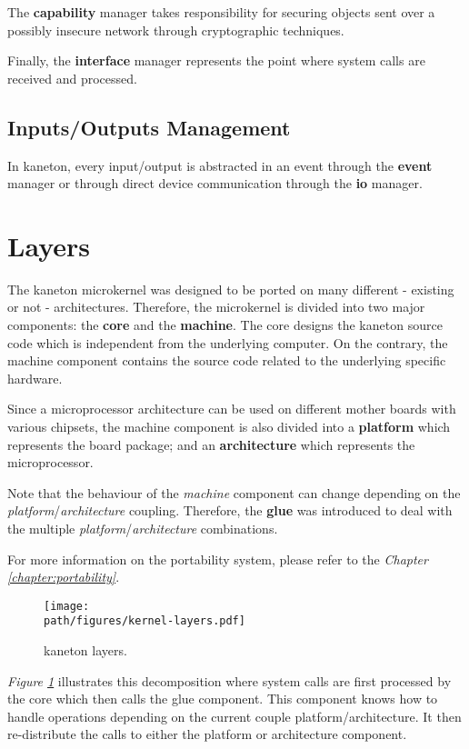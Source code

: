 The \textbf{capability} manager takes responsibility for securing objects
sent over a possibly insecure network through cryptographic techniques.

Finally, the \textbf{interface} manager represents the point where system
calls are received and processed.


\subsection*{Inputs/Outputs Management}

In kaneton, every input/output is abstracted in an event through the
\textbf{event} manager or through direct device communication through the
\textbf{io} manager.

%
%

\section{Layers}

The kaneton microkernel was designed to be ported on many different - existing
or not - architectures. Therefore, the microkernel is divided into two
major components: the \textbf{core} and the \textbf{machine}. The core
designs the kaneton source code which is independent from the underlying
computer. On the contrary, the machine component contains the source code
related to the underlying specific hardware.

Since a microprocessor architecture can be used on different mother boards
with various chipsets, the machine component is also divided into a
\textbf{platform} which represents the board package; and an
\textbf{architecture} which represents the microprocessor.

Note that the behaviour of the \textit{machine} component can change depending
on the \textit{platform}/\textit{architecture} coupling. Therefore, the
\textbf{glue} was introduced to deal with the multiple
\textit{platform}/\textit{architecture} combinations.

For more information on the portability system, please refer to the
\textit{Chapter \ref{chapter:portability}}.

\begin{figure}[h]
  \begin{center}
    \texttt{[image: \\path/figures/kernel-layers.pdf]}
    \caption{kaneton layers.}
    \label{figure:kernel-layers}
  \end{center}
\end{figure}

\textit{Figure \ref{figure:kernel-layers}} illustrates this decomposition where
system calls are first processed by the core which then calls the glue
component. This component knows how to handle operations depending on the
current couple platform/architecture. It then re-distribute the calls to
either the platform or architecture component.
